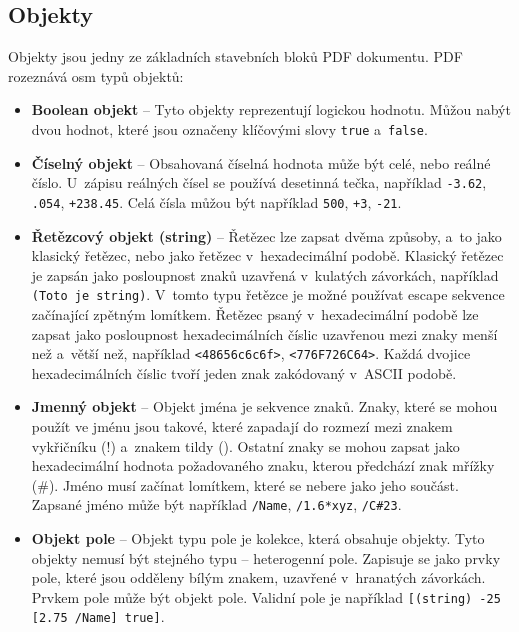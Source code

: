 \subsection*{Objekty}
Objekty jsou jedny ze základních stavebních bloků PDF dokumentu. PDF rozeznává
osm typů objektů:
\begin{itemize}
    \item \textbf{Boolean objekt} -- Tyto objekty reprezentují logickou hodnotu.
    Můžou nabýt dvou hodnot, které jsou označeny klíčovými slovy \texttt{true}
    a~\texttt{false}.
    
    \item \textbf{Číselný objekt} -- Obsahovaná číselná hodnota může být celé,
    nebo reálné číslo. U~zápisu reálných čísel se používá desetinná tečka,
    například \texttt{-3.62}, \texttt{.054}, \texttt{+238.45}. Celá čísla můžou
    být například \texttt{500}, \texttt{+3}, \texttt{-21}.
    
    \item \textbf{Řetězcový objekt (string)} -- Řetězec lze zapsat dvěma způsoby,
    a~to jako klasický řetězec, nebo jako řetězec v~hexadecimální podobě. Klasický
    řetězec je zapsán jako posloupnost znaků uzavřená v~kulatých závorkách,
    například \texttt{(Toto je string)}. V~tomto typu řetězce je možné používat
    escape sekvence začínající zpětným lomítkem. Řetězec psaný v~hexadecimální
    podobě lze zapsat jako posloupnost hexadecimálních číslic uzavřenou mezi znaky
    menší než a~větší než, například \texttt{<48656c6c6f>}, \texttt{<776F726C64>}.
    Každá dvojice hexadecimálních číslic tvoří jeden znak zakódovaný v~ASCII
    podobě.
    
    \item \textbf{Jmenný objekt} -- Objekt jména je sekvence znaků. Znaky, které
    se mohou použít ve jménu jsou takové, které zapadají do rozmezí mezi znakem
    vykřičníku (!) a~znakem tildy (\texttildelow). Ostatní znaky se mohou zapsat
    jako hexadecimální hodnota požadovaného znaku, kterou předchází znak mřížky
    (\#). Jméno musí začínat lomítkem, které se nebere jako jeho součást. Zapsané
    jméno může být například \texttt{/Name}, \texttt{/1.6*xyz}, \texttt{/C\#23}.
    
    \item \textbf{Objekt pole} -- Objekt typu pole je kolekce, která obsahuje
    objekty. Tyto objekty nemusí být stejného typu -- heterogenní pole.
    Zapisuje se jako prvky pole, které jsou odděleny bílým znakem, uzavřené
    v~hranatých závorkách. Prvkem pole může být objekt pole. Validní pole je
    například \texttt{[(string) -25 [2.75 /Name] true]}.
    

\end{itemize}
